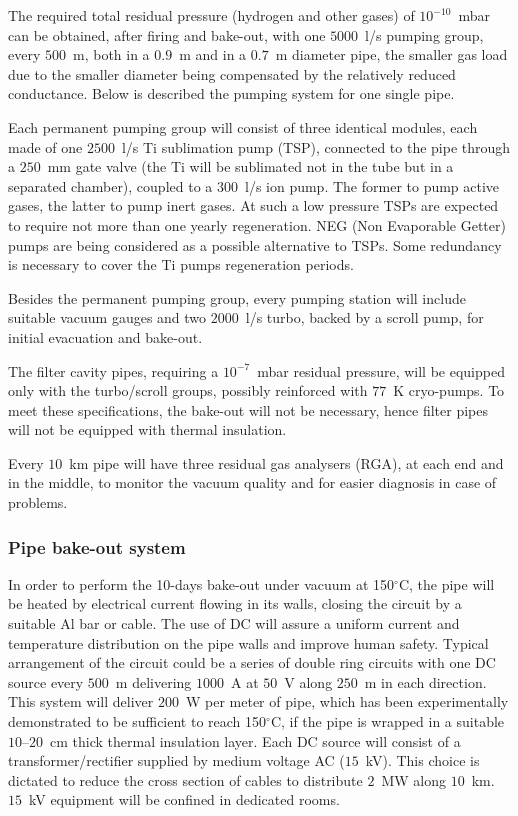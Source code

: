The required total residual pressure (hydrogen and other gases) of $10^{-10}$~mbar can be obtained, after firing and bake-out, with one $5000$~l/s pumping group, every $500$~m, both in a $0.9$~m and in a $0.7$~m diameter pipe, the smaller gas load due to the smaller diameter being compensated by the relatively reduced conductance. Below is described the pumping system for one single pipe. 

Each permanent pumping group will consist of three identical modules, each made of one $2500$~l/s Ti sublimation pump (TSP), connected to the pipe through a $250$~mm gate valve (the Ti will be sublimated not in the tube but in a separated chamber), coupled to a $300$~l/s ion pump. The former to pump active gases, the latter to pump inert gases. At such a low pressure TSPs are expected to require not more than one yearly regeneration. NEG (Non Evaporable Getter) pumps are being considered as a possible alternative to TSPs. Some redundancy is necessary to cover the Ti pumps regeneration periods.

Besides the permanent pumping group, every pumping station will include suitable vacuum gauges and two $2000$~l/s turbo, backed by a scroll pump, for initial evacuation and bake-out. 

The filter cavity pipes, requiring a $10^{-7}$~mbar residual pressure, will be equipped only with the turbo/scroll groups, possibly reinforced with $77$~K cryo-pumps. To meet these specifications, the bake-out will not be necessary, hence filter pipes will not be equipped with thermal insulation.

Every $10$~km pipe will have three residual gas analysers (RGA), at each end and in the middle, to monitor the vacuum quality and for easier diagnosis in case of problems.

\subsubsection{Pipe bake-out system} 
In order to perform the 10-days bake-out under vacuum at 150$^{\circ}$C, the pipe will be heated by electrical current flowing in its walls, closing the circuit by a suitable Al bar or cable. The use of DC will assure a uniform current and temperature distribution on the pipe walls and improve human safety. Typical arrangement of the circuit could be a series of double ring circuits with one DC source every $500$~m delivering $1000$~A at $50$~V along $250$~m in each direction. This system will deliver $200$~W per meter of pipe, which has been experimentally demonstrated to be sufficient to reach 150$^{\circ}$C, if the pipe is wrapped in a suitable $10$--$20$~cm thick thermal insulation layer. Each DC source will consist of a transformer/rectifier supplied by medium voltage AC ($15$~kV). This choice is dictated to reduce the cross section of cables to distribute $2$~MW along $10$~km. $15$~kV equipment will be confined in dedicated rooms. 

